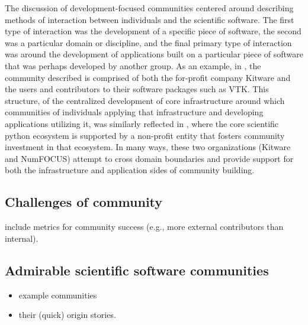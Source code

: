 \documentclass[11pt, oneside]{amsart}
\begin{document}
The discussion of development-focused communities centered around describing
methods of interaction between individuals and the scientific software.  The
first type of interaction was the development of a specific piece of software,
the second was a particular domain or discipline, and the final primary
type of interaction was around the development of applications built on a
particular piece of software that was perhaps developed by another group.  As
an example, in \cite{Hanwell_WSSSPE}, the community described is comprised of
both the for-profit company Kitware and the users and contributors to their
software packages such as VTK.  This structure, of the centralized development
of core infrastructure around which communities of individuals applying that
infrastructure and developing applications utilizing it, was similarly
reflected in \cite{Terrel_WSSSPE}, where the core scientific python ecosystem
is supported by a non-profit entity that fosters community investment in that
ecosystem.  In many ways, these two organizations (Kitware and NumFOCUS)
attempt to cross domain boundaries and provide support for both the
infrastructure and application sides of community building.

\subsection{Challenges of community}
include metrics for community success (e.g., more external
contributors than internal).
\subsection{Admirable scientific software communities}
\begin{itemize}
\item example communities
\item their (quick) origin stories.
\end{itemize}
\end{document}
